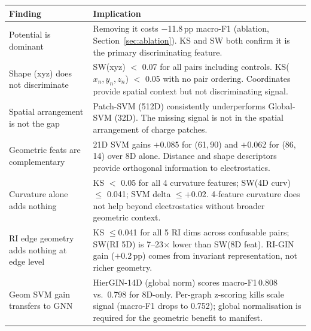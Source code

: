 \begin{center}
  \begin{tabular}{lp{9.2cm}}
    \toprule
    \textbf{Finding} & \textbf{Implication} \\
    \midrule
    Potential is dominant & Removing it costs $-$11.8\,pp macro-F1
                            (ablation, Section~\ref{sec:ablation}).
                            KS and SW both confirm it is the primary
                            discriminating feature. \\[3pt]
    Shape (xyz) does not discriminate & SW(xyz) $<$ 0.07 for all pairs
                            including controls.
                            KS($x_n, y_n, z_n$) $<$ 0.05 with no pair ordering.
                            Coordinates provide spatial context but not
                            discriminating signal. \\[3pt]
    Spatial arrangement is not the gap & Patch-SVM (512D) consistently
                            underperforms Global-SVM (32D).
                            The missing signal is not in the spatial
                            arrangement of charge patches. \\[3pt]
    Geometric feats are complementary & 21D SVM gains $+$0.085 for (61,\,90)
                            and $+$0.062 for (86,\,14) over 8D alone.
                            Distance and shape descriptors provide orthogonal
                            information to electrostatics. \\[3pt]
    Curvature alone adds nothing & KS $<$ 0.05 for all 4 curvature features;
                            SW(4D curv) $\leq$ 0.041; SVM delta $\leq+$0.02.
                            4-feature curvature does not help beyond
                            electrostatics without broader geometric context. \\[3pt]
    RI edge geometry adds nothing at edge level & KS $\leq$0.041 for all 5 RI
                            dims across confusable pairs; SW(RI 5D) is 7--23$\times$
                            lower than SW(8D feat).
                            RI-GIN gain ($+$0.2\,pp) comes from invariant
                            representation, not richer geometry. \\[3pt]
    Geom SVM gain transfers to GNN & HierGIN-14D (global norm) scores
                            macro-F1\,0.808 vs.\ 0.798 for 8D-only.
                            Per-graph z-scoring kills scale signal (macro-F1
                            drops to 0.752); global normalisation is required
                            for the geometric benefit to manifest. \\[3pt]

\end{tabular}
\end{center}
